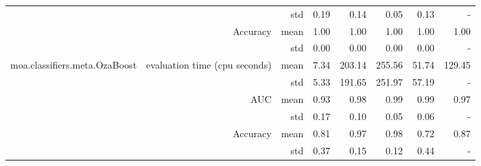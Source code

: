 \documentclass{article}
\begin{document}
\begin{table}[htbp]
\begin{tabular}{rrrrrrrr}
 & & std & 0.19 & 0.14 & 0.05 & 0.13 & -\\
&\multirow{2}[4]{*}{Accuracy} & mean & 1.00 & 1.00 & 1.00 & 1.00& 1.00\\
 & & std & 0.00 & 0.00 & 0.00 & 0.00 & -\\
\multirow{6}[6]{*}{moa.classifiers.meta.OzaBoost}&\multirow{2}[4]{*}{evaluation time (cpu seconds)} & mean & 7.34 & 203.14 & 255.56 & 51.74& 129.45\\
 & & std & 5.33 & 191.65 & 251.97 & 57.19 & -\\
&\multirow{2}[4]{*}{AUC} & mean & 0.93 & 0.98 & 0.99 & 0.99& 0.97\\
 & & std & 0.17 & 0.10 & 0.05 & 0.06 & -\\
&\multirow{2}[4]{*}{Accuracy} & mean & 0.81 & 0.97 & 0.98 & 0.72& 0.87\\
 & & std & 0.37 & 0.15 & 0.12 & 0.44 & -\\
\bottomrule
\end{tabular}%
\label{tab:addlabel}%
\end{table}%
\end{document}
